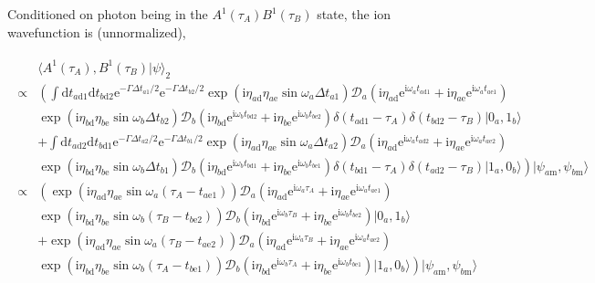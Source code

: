 \documentclass[10pt,fleqn]{article}
\newcommand{\ud}{\mathrm{d}}
\newcommand{\ue}{\mathrm{e}}
\newcommand{\ui}{\mathrm{i}}
\newcommand{\eqar}[1]
{
  \begin{align}
    #1
  \end{align}
}
\newcommand{\paren}[1]{{\left({#1}\right)}}
\newcommand{\lparen}[1]{{\left({#1}\right.}}
\newcommand{\rparen}[1]{{\left.{#1}\right)}}
\begin{document}
Conditioned on photon being in the $A^1(\tau_A)B^1(\tau_B)$ state, the ion wavefunction is (unnormalized),
\eqar{
  \begin{split}
    &\langle A^1(\tau_A),B^1(\tau_B)|\psi\rangle_2\\
    \propto&\lparen{\int\ud t_{a\mathrm{d}1}\ud t_{b\mathrm{d}2}\ue^{-\Gamma\Delta t_{a1}/2}\ue^{-\Gamma\Delta t_{b2}/2}
             \exp\paren{\ui\eta_{a\mathrm{d}}\eta_{a\mathrm{e}}
             \sin\omega_a\Delta t_{a1}}
             \mathcal{D}_a(\ui\eta_{a\mathrm{d}}\ue^{\ui\omega_at_{a\mathrm{d}1}}+\ui\eta_{a\mathrm{e}}\ue^{\ui\omega_at_{a\mathrm{e}1}})}\\
    &\exp\paren{\ui\eta_{b\mathrm{d}}\eta_{b\mathrm{e}}
      \sin\omega_b\Delta t_{b2}}
      \mathcal{D}_b(\ui\eta_{b\mathrm{d}}\ue^{\ui\omega_bt_{b\mathrm{d}2}}+\ui\eta_{b\mathrm{e}}\ue^{\ui\omega_bt_{b\mathrm{e}2}})\delta(t_{a\mathrm{d}1}-\tau_A)\delta(t_{b\mathrm{d}2}-\tau_B)|0_a,1_b\rangle
    \\
    &+\int\ud t_{a\mathrm{d}2}\ud t_{b\mathrm{d}1}\ue^{-\Gamma\Delta t_{a2}/2}\ue^{-\Gamma\Delta t_{b1}/2}
      \exp\paren{\ui\eta_{a\mathrm{d}}\eta_{a\mathrm{e}}
      \sin\omega_a\Delta t_{a2}}
      \mathcal{D}_a(\ui\eta_{a\mathrm{d}}\ue^{\ui\omega_at_{a\mathrm{d}2}}+\ui\eta_{a\mathrm{e}}\ue^{\ui\omega_at_{a\mathrm{e}2}})\\
    &\rparen{
      \exp\paren{\ui\eta_{b\mathrm{d}}\eta_{b\mathrm{e}}
      \sin\omega_b\Delta t_{b1}}
      \mathcal{D}_b(\ui\eta_{b\mathrm{d}}\ue^{\ui\omega_bt_{b\mathrm{d}1}}+\ui\eta_{b\mathrm{e}}\ue^{\ui\omega_bt_{b\mathrm{e}1}})
      \delta(t_{b\mathrm{d}1}-\tau_A)\delta(t_{a\mathrm{d}2}-\tau_B)
      |1_a,0_b\rangle
      }|\psi_{a\mathrm{m}},\psi_{b\mathrm{m}}\rangle\\
    \propto&\lparen{\exp\paren{\ui\eta_{a\mathrm{d}}\eta_{a\mathrm{e}}
             \sin\omega_a\paren{\tau_A-t_{a\mathrm{e}1}}}
             \mathcal{D}_a(\ui\eta_{a\mathrm{d}}\ue^{\ui\omega_a\tau_A}+\ui\eta_{a\mathrm{e}}\ue^{\ui\omega_at_{a\mathrm{e}1}})}\\
    &\exp\paren{\ui\eta_{b\mathrm{d}}\eta_{b\mathrm{e}}
      \sin\omega_b\paren{\tau_B-t_{b\mathrm{e}2}}}
      \mathcal{D}_b(\ui\eta_{b\mathrm{d}}\ue^{\ui\omega_b\tau_B}+\ui\eta_{b\mathrm{e}}\ue^{\ui\omega_bt_{b\mathrm{e}2}})|0_a,1_b\rangle
    \\
    &+\exp\paren{\ui\eta_{a\mathrm{d}}\eta_{a\mathrm{e}}
      \sin\omega_a\paren{\tau_B-t_{a\mathrm{e}2}}}
      \mathcal{D}_a(\ui\eta_{a\mathrm{d}}\ue^{\ui\omega_a\tau_B}+\ui\eta_{a\mathrm{e}}\ue^{\ui\omega_at_{a\mathrm{e}2}})\\
    &\rparen{
      \exp\paren{\ui\eta_{b\mathrm{d}}\eta_{b\mathrm{e}}
      \sin\omega_b\paren{\tau_A-t_{b\mathrm{e}1}}}
      \mathcal{D}_b(\ui\eta_{b\mathrm{d}}\ue^{\ui\omega_b\tau_A}+\ui\eta_{b\mathrm{e}}\ue^{\ui\omega_bt_{b\mathrm{e}1}})
      |1_a,0_b\rangle
      }|\psi_{a\mathrm{m}},\psi_{b\mathrm{m}}\rangle
  \end{split}
}
\end{document}

